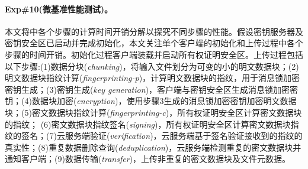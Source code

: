 \paragraph*{Exp\#10(微基准性能测试)。}本文将\sysnameS 中各个步骤的计算时间开销分解以探究不同步骤的性能。假设密钥服务器及密钥安全区已启动并完成初始化，本文关注单个客户端的初始化和上传过程中各个步骤的时间开销。初始化过程客户端装载并启动所有权证明安全区。上传过程包括以下步骤:(1)数据分块(\textit{chunking})，将输入文件划分为可变的小的明文数据块；(2)明文数据块指纹计算(\textit{fingerprinting-p})，计算明文数据块的指纹，用于消息锁加密密钥生成；(3)密钥生成(\textit{key generation})，客户端与密钥安全区生成消息锁加密密钥；(4)数据块加密(\textit{encryption})，使用步骤3生成的消息锁加密密钥加密明文数据块；(5)密文数据块指纹计算(\textit{fingerprinting-c})，所有权证明安全区计算密文数据块的指纹； (6)密文数据块指纹签名(\textit{signing})，所有权证明安全区计算密文数据块指纹的签名；(7)云服务端验证(\textit{verification})，云服务端基于签名验证接收到的指纹的真实性；(8)重复数据删除查询(\textit{deduplication})，云服务端检测重复的密文数据块并通知客户端；(9)数据传输(\textit{transfer})，上传非重复的密文数据块及文件元数据。

